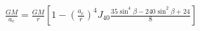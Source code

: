 \documentclass[10pt]{article}
\begin{document}
\begin{align*}\frac{G M}{a_{e}} = \frac{G M}{r} \left[ 1 - \left( \frac{a_{e}}{r} \right)^4 J_{40} \frac{ 35 \sin^4 \beta - 240 \sin^2 \beta + 24}{8} \right]\end{align*}
\end{document}

